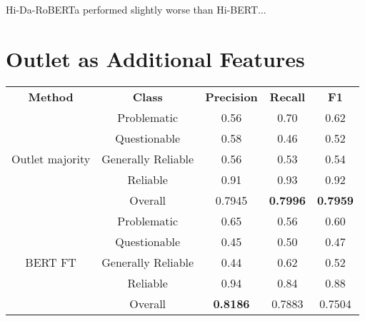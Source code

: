 Hi-Da-RoBERTa performed slightly worse than Hi-BERT...

\section{Outlet as Additional Features}

\begin{table}[htbp]
    \centering
    \scriptsize
    \begin{tabular}{| c | c | c | c | c |}
        \hline                            \textbf{Method} & \textbf{Class}     & \textbf{Precision} & \textbf{Recall} & \textbf{F1}     \\\cline{1-5}
        \multirow{5}{*}{Outlet majority}                  & Problematic        & 0.56               & 0.70            & 0.62            \\
                                                          & Questionable       & 0.58               & 0.46            & 0.52            \\
                                                          & Generally Reliable & 0.56               & 0.53            & 0.54            \\
                                                          & Reliable           & 0.91               & 0.93            & 0.92            \\\cline{2-5}
                                                          & Overall            & 0.7945             & \textbf{0.7996} & \textbf{0.7959} \\
        \hline
        \multirow{5}{*}{BERT FT}                          & Problematic        & 0.65               & 0.56            & 0.60            \\
                                                          & Questionable       & 0.45               & 0.50            & 0.47            \\
                                                          & Generally Reliable & 0.44               & 0.62            & 0.52            \\
                                                          & Reliable           & 0.94               & 0.84            & 0.88            \\\cline{2-5}
                                                          & Overall            & \textbf{0.8186}    & 0.7883          & 0.7504          \\
        \hline

\end{tabular}
\end{table}
